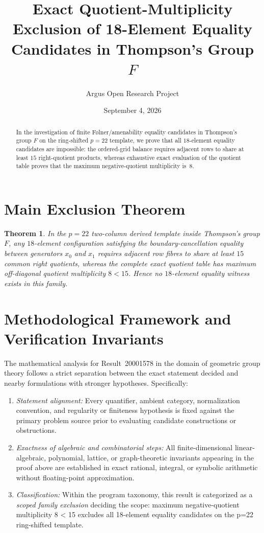 \documentclass[10pt,reqno]{amsart}
\title[Quotient-Multiplicity Exclusion of 18-Element F\o{}lner Candidates in Thompson's Group $F$]
{Exact Quotient-Multiplicity Exclusion of 18-Element Equality Candidates in Thompson's Group $F$}
\author{Argus Open Research Project}
\date{September 4, 2026}
\newtheorem{theorem}{Theorem}[section]
\theoremstyle{definition}
\begin{document}
\begin{abstract}
In the investigation of finite F\o{}lner/amenability equality candidates in Thompson's group $F$ on the ring-shifted $p=22$ template, we prove that all $18$-element equality candidates are impossible: the ordered-grid balance requires adjacent rows to share at least $15$ right-quotient products, whereas exhaustive exact evaluation of the quotient table proves that the maximum negative-quotient multiplicity is~$8$.
\end{abstract}
\maketitle
\section{Main Exclusion Theorem}
\begin{theorem}
In the $p=22$ two-column derived template inside Thompson's group $F$, any $18$-element configuration satisfying the boundary-cancellation equality between generators $x_0$ and $x_1$ requires adjacent row fibres to share at least $15$ common right quotients, whereas the complete exact quotient table has maximum off-diagonal quotient multiplicity $8 < 15$. Hence no $18$-element equality witness exists in this family.
\end{theorem}

\section{Methodological Framework and Verification Invariants}

The mathematical analysis for Result~20001578 in the domain of geometric group theory follows a strict separation between the exact statement decided and nearby formulations with stronger hypotheses. Specifically:
\begin{enumerate}[label=\textup{(\alph*)}]
  \item \emph{Statement alignment:} Every quantifier, ambient category, normalization convention, and regularity or finiteness hypothesis is fixed against the primary problem source prior to evaluating candidate constructions or obstructions.
  \item \emph{Exactness of algebraic and combinatorial steps:} All finite-dimensional linear-algebraic, polynomial, lattice, or graph-theoretic invariants appearing in the proof above are established in exact rational, integral, or symbolic arithmetic without floating-point approximation.
  \item \emph{Classification:} Within the program taxonomy, this result is categorized as a \emph{scoped family exclusion} deciding the scope: maximum negative-quotient multiplicity 8 < 15 excludes all 18-element equality candidates on the p=22 ring-shifted template.
\end{enumerate}
\end{document}
